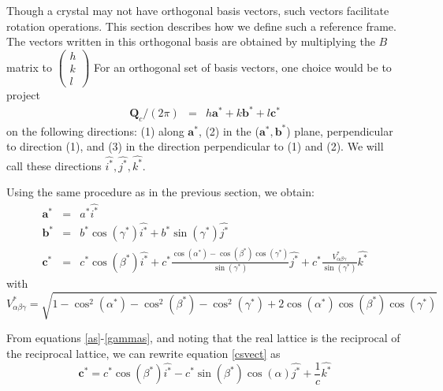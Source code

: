 \documentclass[prb]{revtex4}%
\begin{document}
Though a crystal may not have orthogonal basis vectors, such vectors facilitate
rotation operations. This section describes
how we define such a reference frame.
The vectors written in this orthogonal basis are
obtained by multiplying the $B$ matrix to  $\left(\begin{array}{c}
                                                            h \\
                                                            k \\
                                                            l
                                                          \end{array}\right)$
For an orthogonal
set of basis vectors, one choice would be to project
\begin{eqnarray}
    \textbf{Q}_c/(2\pi) &=&  h \textbf{a}^* + k \textbf{b}^*+ l \textbf{c}^*
\end{eqnarray}
on the following directions: (1) along $\textbf{a}^*$, (2) in the ($\textbf{a}^*,\textbf{b}^*$)
plane, perpendicular to direction (1), and (3) in the direction perpendicular to (1) and (2). We will call
these directions $\widehat{i^*}, \widehat{j^*}, \widehat{k^*}$.

Using the same procedure as in the previous section, we obtain:
\begin{eqnarray}
  \textbf{a}^* &=& a^*\widehat{i^*}\label{asvect}\\
  \textbf{b}^* &=& b^* \cos(\gamma^*) \widehat{i^*} + b^* \sin(\gamma^*) \widehat{j^*}\label{bsvect}\\
  \textbf{c}^* &=& c^* \cos(\beta^*) \widehat{i^*} + c^* \frac{\cos(\alpha^*)-\cos(\beta^*)\cos(\gamma^*)}{\sin(\gamma^*)}\widehat{j^*}+
  c^* \frac{V_{\alpha\beta\gamma}^*}{\sin(\gamma^*)}\widehat{k^*}\label{csvect}
\end{eqnarray}
\noindent with
\begin{equation}
    V_{\alpha\beta\gamma}^* = \sqrt{1-\cos^2(\alpha^*)-\cos^2(\beta^*)-\cos^2(\gamma^*)+2 \cos(\alpha^*) \cos(\beta^*) \cos(\gamma^*)}
\end{equation}

From equations \ref{as}-\ref{gammas}, and noting that the real lattice is the reciprocal of the reciprocal lattice, we can rewrite equation \ref{csvect} as
\begin{equation}
    \textbf{c}^* = c^* \cos(\beta^*) \widehat{i^*} - c^* \sin(\beta^*) \cos(\alpha)\widehat{j^*} +
    \frac{1}{c}\widehat{k^*}
\end{equation}
\end{document}
